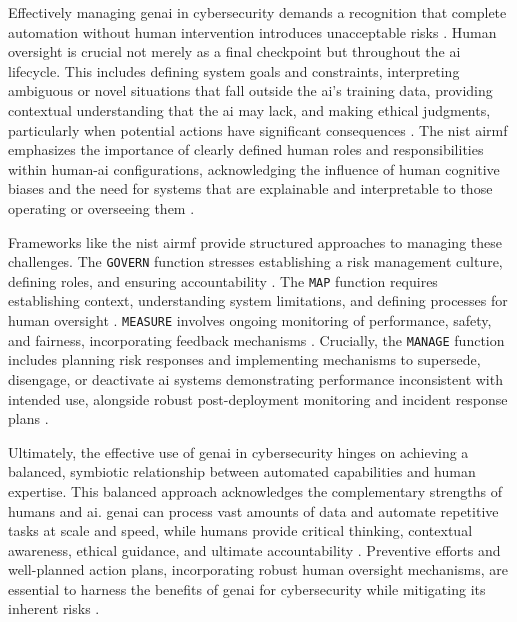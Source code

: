 Effectively managing \gls{genai} in cybersecurity demands a recognition that complete automation without human intervention introduces unacceptable risks \cite{patel_generative_2025}. Human oversight is crucial not merely as a final checkpoint but throughout the \gls{ai} lifecycle. This includes defining system goals and constraints, interpreting ambiguous or novel situations that fall outside the \gls{ai}'s training data, providing contextual understanding that the \gls{ai} may lack, and making ethical judgments, particularly when potential actions have significant consequences \cite{tabassi_artificial_2023}. The \gls{nist} \gls{airmf} emphasizes the importance of clearly defined human roles and responsibilities within human-\gls{ai} configurations, acknowledging the influence of human cognitive biases and the need for systems that are explainable and interpretable to those operating or overseeing them \cite{tabassi_artificial_2023}.

Frameworks like the \gls{nist} \gls{airmf} provide structured approaches to managing these challenges. The \texttt{GOVERN} function stresses establishing a risk management culture, defining roles, and ensuring accountability \cite[p. 21-24]{tabassi_artificial_2023}. The \texttt{MAP} function requires establishing context, understanding system limitations, and defining processes for human oversight \cite[p. 24-28]{tabassi_artificial_2023}. \texttt{MEASURE} involves ongoing monitoring of performance, safety, and fairness, incorporating feedback mechanisms \cite[p. 28-31]{tabassi_artificial_2023}. Crucially, the \texttt{MANAGE} function includes planning risk responses and implementing mechanisms to supersede, disengage, or deactivate \gls{ai} systems demonstrating performance inconsistent with intended use, alongside robust post-deployment monitoring and incident response plans \cite[p. 31-33]{tabassi_artificial_2023}.

Ultimately, the effective use of \gls{genai} in cybersecurity hinges on achieving a balanced, symbiotic relationship between automated capabilities and human expertise. This balanced approach acknowledges the complementary strengths of humans and \gls{ai}. \gls{genai} can process vast amounts of data and automate repetitive tasks at scale and speed, while humans provide critical thinking, contextual awareness, ethical guidance, and ultimate accountability \cite{patel_generative_2025}. Preventive efforts and well-planned action plans, incorporating robust human oversight mechanisms, are essential to harness the benefits of \gls{genai} for cybersecurity while mitigating its inherent risks \cite{patel_generative_2025}.

